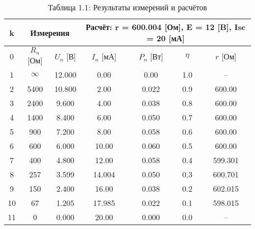 \begin{table}[H]
	\centering
	\addtocounter{table}{0}
	\caption*{Таблица 1.1: Результаты измерений и расчётов}
	\begin{tabular}{|c|c|c|c|c|c|c|}
		\hline
		k  & \multicolumn{2}{c|}{Измерения} & \multicolumn{4}{c|}{Расчёт: r = 600.004 [Ом], E = 12 [B], Isc = 20 [мА]}                                               \\
		\hline
		0  & $R_n$ [Ом] & $U_n$ [В] & $I_n$ [мА] & $P_n$ [Вт] & $\eta$ & $r$ [Ом] \\
		\hline
		1  & $\infty$   & 12.000    & 0.00       & 0.00       & 1.0    & --       \\
		2  & 5400       & 10.800    & 2.00       & 0.022      & 0.9    & 600.00   \\
		3  & 2400       & 9.600     & 4.00       & 0.038      & 0.8    & 600.00   \\
		4  & 1400       & 8.400     & 6.00       & 0.050      & 0.7    & 600.00   \\
		5  & 900        & 7.200     & 8.00       & 0.058      & 0.6    & 600.00   \\
		6  & 600        & 6.000     & 10.00      & 0.060      & 0.5    & 600.00   \\
		7  & 400        & 4.800     & 12.00      & 0.058      & 0.4    & 599.301  \\
		8  & 257        & 3.599     & 14.004     & 0.050      & 0.3    & 600.701  \\
		9  & 150        & 2.400     & 16.00      & 0.038      & 0.2    & 602.015  \\
		10 & 67         & 1.205     & 17.985     & 0.022      & 0.1    & 598.015  \\
		11 & 0          & 0.000     & 20.00      & 0.000      & 0.0    & --       \\
		\hline
	\end{tabular}
\end{table}
